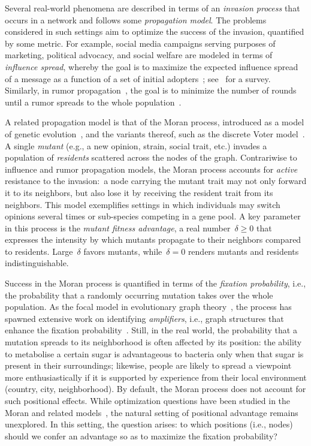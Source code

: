 \documentclass[letterpaper]{article}
\newcommand{\FitAdv}{\delta}
\begin{document}
Several real-world phenomena are described in terms of an \emph{invasion process} that occurs in a network and follows some \emph{propagation model}. 
The problems considered in such settings aim to optimize the success of the invasion, quantified by some metric. 
For example, social media campaigns serving purposes of marketing, political advocacy, and social welfare are modeled in terms of \emph{influence spread}, whereby the goal is to maximize the expected influence spread of a message as a function of a set of initial adopters~\cite{Kempe2003, Youze:2014, Borgs:2014:MSI, Tang:2015:IMN, Zhang2020}; see~\cite{IM-Survey} for a survey. 
Similarly, in rumor propagation~\cite{Demers1987}, the goal is to minimize the number of rounds until a rumor
spreads to the whole population~\cite{Fountoulakis2012}.

A related propagation model is that of the Moran process, introduced as a model of genetic evolution~\cite{Moran1958}, and the variants thereof, such as the discrete Voter model~\cite{Clifford1973,Liggett1985, Antal2006, Talamali2021}. 
A single \emph{mutant} (e.g., a new opinion, strain, social trait, etc.) invades a population of \emph{residents} scattered across the nodes of the graph. 
Contrariwise to influence and rumor propagation models, the Moran process accounts for \emph{active} resistance to the invasion:~a node carrying the mutant trait may not only forward it to its neighbors, but also lose it by receiving the resident trait from its neighbors. 
This model exemplifies settings in which individuals may switch opinions several times or sub-species competing in a gene pool.
A key parameter in this process is the \emph{mutant fitness advantage}, a real number~$\FitAdv\geq 0$ that expresses the intensity by which mutants propagate to their neighbors compared to residents. Large~$\FitAdv$ favors mutants, while~$\FitAdv=0$ renders mutants and residents indistinguishable.

Success in the Moran process is quantified in terms of the \emph{fixation probability}, i.e., the probability that a randomly occurring mutation takes over the whole population. 
As the focal model in evolutionary graph theory~\cite{Lieberman2005}, the process has spawned extensive work on identifying \emph{amplifiers}, i.e., graph structures that enhance the fixation probability~\cite{Monk2014,Giakkoupis16,Galanis2017,Pavlogiannis2018,Tkadlec2021}. 
Still, in the real world, the probability that a mutation spreads to its neighborhood is often affected by its position:
the ability to metabolise a certain sugar is advantageous to bacteria only when that sugar is present in their surroundings;
likewise, people are likely to spread a viewpoint more enthusiastically
if it is supported by experience from their local environment (country, city, neighborhood). 
By default, the Moran process does not account for such positional effects.
While optimization questions have been studied in the Moran and related models~\cite{EvenDar2007}, the natural setting of positional advantage remains unexplored. 
In this setting, the question arises: to which positions (i.e., nodes) should we confer an advantage so as to maximize the fixation probability?
\end{document}
